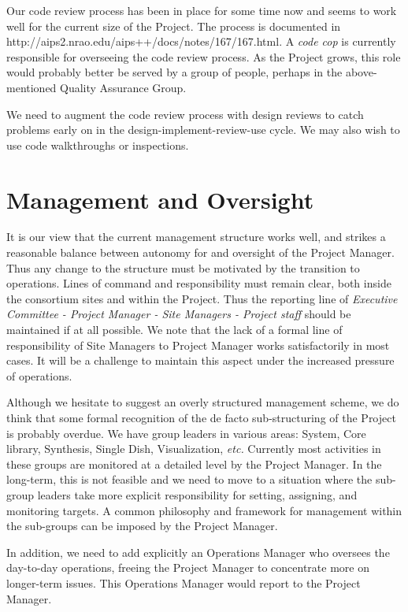 Our code review process has been in place for some time now and seems to work
well for the current size of the Project. The process is documented in 
{http://aips2.nrao.edu/aips++/docs/notes/167/167.html}.
A {\em code cop} is currently responsible for overseeing the code review
process. As the Project grows, this role would probably better be served
by a group of people, perhaps in the above-mentioned Quality Assurance 
Group.

We need to augment the code review process with design reviews to catch
problems early on in the design-implement-review-use cycle. We may also
wish to use code walkthroughs or inspections.

\section{Management and Oversight}

It is our view that the current management structure works well, and
strikes a reasonable balance between autonomy for and oversight of the
Project Manager. Thus any change to the structure must be motivated by
the transition to operations. Lines of command and responsibility
must remain clear, both inside the consortium sites and within the
Project. Thus the reporting line of {\em Executive Committee - Project
Manager - Site Managers - Project staff} should be maintained if at
all possible. We note that the lack of a formal line of responsibility
of Site Managers to Project Manager works satisfactorily in most cases.
It will be a challenge to maintain this aspect under the increased
pressure of operations.

Although we hesitate to suggest an overly structured management
scheme, we do think that some formal recognition of the de facto
sub-structuring of the Project is probably overdue. We have group
leaders in various areas: System, Core library, Synthesis, Single
Dish, Visualization, {\em etc.} Currently most activities in these
groups are monitored at a detailed level by the Project Manager. In
the long-term, this is not feasible and we need to move to a situation
where the sub-group leaders take more explicit responsibility for
setting, assigning, and monitoring targets. A common philosophy and
framework for management within the sub-groups can be imposed by the
Project Manager.

In addition, we need to add explicitly an Operations Manager who
oversees the day-to-day operations, freeing the Project Manager to
concentrate more on longer-term issues. This Operations Manager would
report to the Project Manager.

